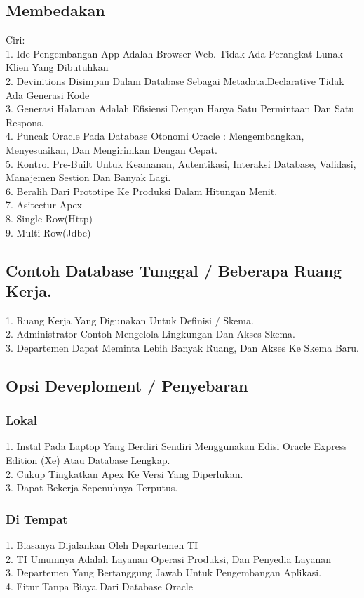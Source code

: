 \documentclass{article}
\begin{document}
\subsection{Membedakan}
Ciri:\\
1. Ide Pengembangan App Adalah Browser Web. Tidak Ada Perangkat Lunak Klien Yang Dibutuhkan\\
2. Devinitions Disimpan Dalam Database Sebagai Metadata.Declarative Tidak Ada Generasi Kode\\
3. Generasi Halaman Adalah Efisiensi Dengan Hanya Satu Permintaan Dan Satu Respons.\\
4. Puncak Oracle Pada Database Otonomi Oracle : Mengembangkan, Menyesuaikan, Dan Mengirimkan Dengan Cepat.\\
5. Kontrol Pre-Built Untuk Keamanan, Autentikasi, Interaksi Database, Validasi, Manajemen Sestion Dan Banyak Lagi.\\
6. Beralih Dari Prototipe Ke Produksi Dalam Hitungan Menit.\\
7. Asitectur Apex\\
8. Single Row(Http)\\
9. Multi Row(Jdbc)\\

\subsection{Contoh Database Tunggal / Beberapa Ruang Kerja.}
1.	Ruang Kerja Yang Digunakan Untuk Definisi / Skema.\\
2.	Administrator Contoh Mengelola Lingkungan Dan Akses Skema.\\
3.	Departemen Dapat Meminta Lebih Banyak Ruang, Dan Akses Ke Skema Baru.\\

\subsection{Opsi Deveploment / Penyebaran}
\subsubsection{Lokal}
1.	Instal Pada Laptop Yang Berdiri Sendiri Menggunakan Edisi Oracle Express Edition (Xe) Atau Database Lengkap.\\
2.	Cukup Tingkatkan Apex Ke Versi Yang Diperlukan.\\
3.	Dapat Bekerja Sepenuhnya Terputus.\\

\subsubsection{Di Tempat}
1.	Biasanya Dijalankan Oleh Departemen TI\\
2.	TI Umumnya Adalah Layanan Operasi Produksi, Dan Penyedia Layanan\\
3.	Departemen Yang Bertanggung Jawab Untuk Pengembangan Aplikasi.\\
4.	Fitur Tanpa Biaya Dari Database Oracle\\
\end{document}
